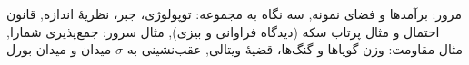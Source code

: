\documentclass[a4paper,11pt,oneside,openany]{book}
\begin{document}
  {{مرور: برآمدها و فضای نمونه},
   {سه نگاه به مجموعه: توپولوژی، جبر، نظریهٔ اندازه},
   {قانون احتمال و مثال پرتاب سکه (دیدگاه فراوانی و بیزی)},
   {مثال سرور: جمع‌پذیری شمارا},
   {مثال مقاومت: وزن گویاها و گنگ‌ها، قضیهٔ ویتالی},
   {عقب‌نشینی به $\sigma$-میدان و میدان بورل}}

\mainmatter
\setcounter{chapter}{1}   %

\end{document}
